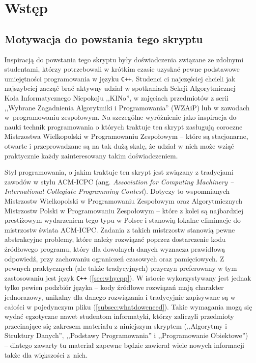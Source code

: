 \chapter{Wstęp}

\section{Motywacja do powstania tego skryptu}

Inspiracją do powstania tego skryptu były doświadczenia związane ze zdolnymi
studentami, którzy potrzebowali w krótkim czasie uzyskać pewne podstawowe
umiejętności programowania w języku \texttt{C++}. Studenci ci najczęściej
chcieli jak najszybciej zacząć brać aktywny udział w spotkaniach Sekcji
Algorytmicznej Koła Informatycznego Niepokoju ,,KINo'', w zajęciach przedmiotów
z serii ,,Wybrane Zagadnienia Algorytmiki i Programowania'' (WZAiP) lub w zawodach
w~programowaniu zespołowym. Na szczególne wyróżnienie jako inspiracja do nauki
technik programowania o których traktuje ten skrypt zasługują coroczne
Mistrzostwa Wielkopolski w Programowaniu Zespołowym -- które są stacjonarne,
otwarte i przeprowadzane są na tak dużą skalę, że udział w nich może wziąć
praktycznie każdy zainteresowany takim doświadczeniem.

Styl programowania, o jakim traktuje ten skrypt jest związany z tradycjami
zawodów w stylu ACM-ICPC (ang. \emph{Association for Computing Machinery --
International Collegiate Programming Contest}). Dotyczy to wspomnianych
Mistrzostw Wielkopolski w Programowaniu Zespołowym oraz Algorytmicznych
Mistrzostw Polski w Programowaniu Zespołowym -- które z kolei są najbardziej
prestiżowym wydarzeniem tego typu w Polsce i stanowią lokalne eliminacje
do mistrzostw świata ACM-ICPC. Zadania z takich mistrzostw stanowią pewne
abstrakcyjne problemy, które należy rozwiązać poprzez dostarczenie kodu
źródłowego programu, który dla dowolnych danych wyznacza prawidłową odpowiedź,
przy zachowaniu ograniczeń czasowych oraz pamięciowych. Z pewnych praktycznych
(ale także tradycyjnych) przyczyn preferowany w tym zastosowaniu jest język
\texttt{C++} (\ref{sec:whycpp}). W istocie wykorzystywany jest jednak tylko
pewien podzbiór języka -- kody źródłowe rozwiązań mają charakter jednorazowy,
unikalny dla danego rozwiązania i tradycyjnie zapisywane są w całości
w pojedynczym pliku (\ref{subsec:whatdoweneed}). Takie wymagania mogą się wydać
egzotyczne nawet studentom informatyki, którzy zaliczyli przedmioty przecinające
się zakresem materiału z niniejszym skryptem (,,Algorytmy i Struktury Danych'',
,,Podstawy Programowania'' i ,,Programowanie Obiektowe'') -- dlatego
zawarty tu materiał zapewne będzie zawierał wiele nowych informacji także dla
większości z~nich.

